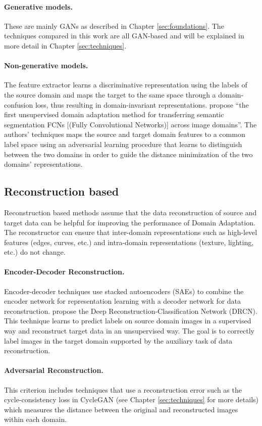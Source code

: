 \paragraph{Generative models.}
These are mainly GANs as described in Chapter \ref{sec:foundations}. The techniques compared in this work are all GAN-based and will be explained in more detail in Chapter \ref{sec:techniques}.

\paragraph{Non-generative models.}
The feature extractor learns a discriminative representation using the labels of the source domain and maps the target to the same space through a domain-confusion loss, thus resulting in domain-invariant representations. \cite{DBLP:journals/corr/HoffmanWYD16} propose ``the first unsupervised domain adaptation method for transferring semantic segmentation FCNs [(Fully Convolutional Networks)] across image domains''. The authors' techniques maps the source and target domain features to a common label space using an adversarial learning procedure that learns to distinguish between the two domains in order to guide the distance minimization of the two domains' representations. 

\subsection{Reconstruction based}
Reconstruction based methods assume that the data reconstruction of source and target data can be helpful for improving the performance of Domain Adaptation. The reconstructor can ensure that inter-domain representations such as high-level features (edges, curves, etc.) and intra-domain representations (texture, lighting, etc.) do not change.

\paragraph{Encoder-Decoder Reconstruction.}
Encoder-decoder techniques use stacked autoencoders (SAEs) to combine the encoder network for representation learning with a decoder network for data reconstruction. \cite{DBLP:journals/corr/GhifaryKZBL16} propose the Deep Reconstruction-Classification Network (DRCN). This technique learns to predict labels on source domain images in a supervised way and reconstruct target data in an unsupervised way. The goal is to correctly label images in the target domain supported by the auxiliary task of data reconstruction. 

\paragraph{Adversarial Reconstruction.}
This criterion includes techniques that use a reconstruction error such as the cycle-consistency loss in CycleGAN (see Chapter \ref{sec:techniques} for more details) which measures the distance between the original and reconstructed images within each domain.
